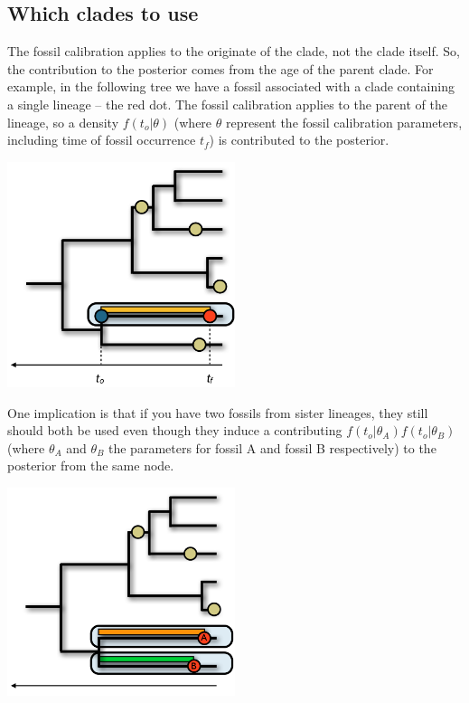 \documentclass{article}
\begin{document}
\subsection{Which clades to use}
The fossil calibration applies to the originate of the clade, not the clade itself.
So, the contribution to the posterior comes from the age of the parent clade.
For example, in the following tree we have a fossil associated with a clade
containing a single lineage -- the red dot. The fossil calibration applies to the
parent of the lineage, so a density $f(t_o|\theta)$ (where $\theta$ represent the
fossil calibration parameters, including time of fossil occurrence $t_f$) is contributed 
to the posterior.
\begin{center}\includegraphics[width=0.5\textwidth,clip=true]{originate.png}\end{center}
One implication is that if you have two fossils from sister lineages, they still
should both be used even though they induce a contributing $f(t_o|\theta_A)f(t_o|\theta_B)$
(where $\theta_A$ and $\theta_B$ the parameters for fossil A and fossil B respectively)
to the posterior from the same node. 
\begin{center}\includegraphics[width=0.5\textwidth,clip=true]{sisterLineages.png}\end{center}
\end{document}
